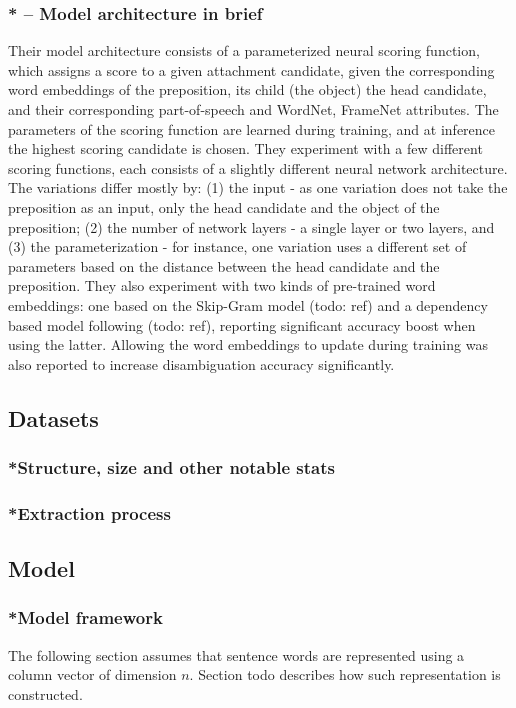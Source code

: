 \subsubsection{* -- Model architecture in brief}
Their model architecture consists of a parameterized neural scoring function, which assigns a score to a given attachment candidate, given the corresponding word embeddings of the preposition, its child (the object) the head candidate, and their corresponding part-of-speech and WordNet, FrameNet attributes. The parameters of the scoring function are learned during training, and at inference the highest scoring candidate is chosen. They experiment with a few different scoring functions, each consists of a slightly different neural network architecture. The variations differ mostly by: (1)  the input - as one variation does not take the preposition as an input, only the head candidate and the object of the preposition; (2) the number of network layers - a single layer or two layers, and (3) the parameterization - for instance, one variation uses a different set of parameters based on the distance between the head candidate and the preposition. They also experiment with two kinds of pre-trained word embeddings: one based on the Skip-Gram model (todo: ref) and a dependency based model following (todo: ref), reporting significant accuracy boost when using the latter. Allowing the word embeddings to update during training was also reported to increase disambiguation accuracy significantly. 

\subsection{Datasets}
\subsubsection{*Structure, size and other notable stats}
\subsubsection{*Extraction process}

\subsection{Model}
\subsubsection{*Model framework}
The following section assumes that sentence words are represented using a column vector of dimension $n$. Section todo describes how such representation is constructed. 

